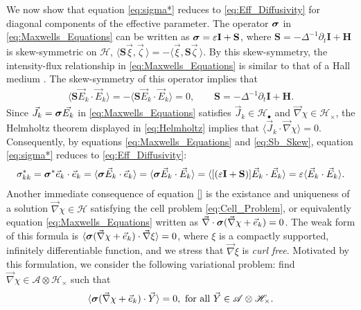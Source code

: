 \documentclass[11pt]{amsart}
\newcommand{\Hb}{\mathbf{H}}
\newcommand{\Ib}{\mathbf{I}}
\newcommand{\Sb}{\mathbf{S}}
\newcommand{\Hs}{\mathscr{H}}
\newcommand\bsig{\mbox{\boldmath${\sigma}$}}
\begin{document}
We now show that equation \eqref{eq:sigma*} reduces to
\eqref{eq:Eff_Diffusivity} for diagonal components of the effective
parameter. The operator $\bsig$ in \eqref{eq:Maxwells_Equations} can
be written as $\bsig=\varepsilon\Ib+\Sb$, where  $\Sb=-\Delta^{-1}\partial_t\Ib+\Hb$ is
skew-symmetric on $\Hs$,
$\langle\Sb\vec{\xi},\vec{\zeta}\,\rangle=-\langle\vec{\xi},\Sb\vec{\zeta}\,\rangle$. By this
skew-symmetry, the intensity-flux relationship in
\eqref{eq:Maxwells_Equations} is similar to that of a Hall medium
\cite{Isichenko:JNS:1991:375}. The skew-symmetry of this 
operator implies that 
%
\begin{align}\label{eq:Sb_Skew}
  \langle\Sb\vec{E}_k\cdot\vec{E}_k\rangle=-\langle\Sb\vec{E}_k\cdot\vec{E}_k\rangle=0,
  \qquad
  \Sb=-\Delta^{-1}\partial_t\Ib+\Hb.
\end{align}
%
Since $\vec{J}_k=\bsig\vec{E_k}$ in \eqref{eq:Maxwells_Equations}
satisfies $\vec{J}_k\in\mathscr{H}_\bullet$ and $\vec{\nabla}\chi\in\mathscr{H}_\times$, the
Helmholtz theorem displayed in \eqref{eq:Helmholtz} implies that
$\langle\vec{J}_k\cdot\vec{\nabla}\chi\rangle=0$. Consequently, by equations
\eqref{eq:Maxwells_Equations} and \eqref{eq:Sb_Skew}, equation
\eqref{eq:sigma*} reduces to \eqref{eq:Eff_Diffusivity}:     
%
\begin{align}
  \sigma^*_{kk}=\bsig^*\vec{e}_k\cdot\vec{e}_k 
       =\langle\bsig\vec{E}_k\cdot\vec{e}_k\rangle
       =\langle\bsig\vec{E}_k\cdot\vec{E}_k\rangle
       =\langle[(\varepsilon\Ib+\Sb)]\vec{E}_k\cdot\vec{E}_k\rangle
       =\varepsilon\langle\vec{E}_k\cdot\vec{E}_k\rangle.
\end{align}
%
Another immediate consequence of equation \eqref{} is the existance
and uniqueness of a solution $\vec{\nabla}\chi\in\Hs$ satisfying the cell
problem \eqref{eq:Cell_Problem}, or equivalently equation
\eqref{eq:Maxwells_Equations} written as
$\vec{\nabla}\cdot\bsig(\vec{\nabla}\chi+\vec{e}_k)=0$. The weak form of this formula 
is $\langle\bsig(\vec{\nabla}\chi+\vec{e}_k)\cdot\vec{\nabla}\xi\rangle=0$, where $\xi$ is a compactly
supported, infinitely differentiable function, and we stress that
$\vec{\nabla}\xi$ is \emph{curl free}. Motivated by this formulation, we
consider the following variational problem: find
$\vec{\nabla}\chi\in\mathscr{A}\otimes\Hs_\times$ such that 
%
\begin{align}
  \langle\bsig(\vec{\nabla}\chi+\vec{e}_k)\cdot\vec{Y}\rangle=0, \text{ for all }
  \vec{Y}\in\mathscr{A}\otimes\Hs_\times.
\end{align}
\end{document}
